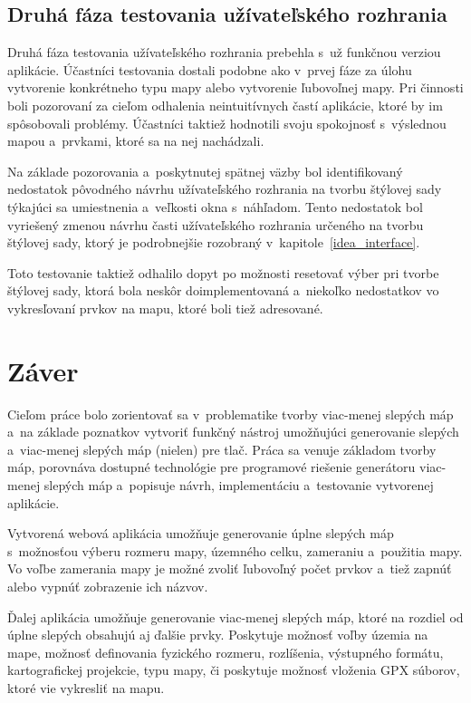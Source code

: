\section{Druhá fáza testovania užívateľského rozhrania}
Druhá fáza testovania užívateľského rozhrania prebehla s~už funkčnou verziou aplikácie. Účastníci testovania dostali podobne ako v~prvej fáze za úlohu vytvorenie konkrétneho typu mapy alebo vytvorenie ľubovoľnej mapy. Pri činnosti boli pozorovaní za cieľom odhalenia neintuitívnych častí aplikácie, ktoré by im spôsobovali problémy. Účastníci taktiež hodnotili svoju spokojnosť s~výslednou mapou a~prvkami, ktoré sa na nej nachádzali.

Na základe pozorovania a~poskytnutej spätnej väzby bol identifikovaný nedostatok pôvodného návrhu užívateľského rozhrania na tvorbu štýlovej sady týkajúci sa umiestnenia a~veľkosti okna s~náhľadom. Tento nedostatok bol vyriešený zmenou návrhu časti užívateľského rozhrania určeného na tvorbu štýlovej sady, ktorý je podrobnejšie rozobraný v~kapitole~\ref{idea_interface}.

Toto testovanie taktiež odhalilo dopyt po možnosti resetovať výber pri tvorbe štýlovej sady, ktorá bola neskôr doimplementovaná a~niekoľko nedostatkov vo vykresľovaní prvkov na mapu, ktoré boli tiež adresované. 


\chapter{Záver}
\label{end}
Cieľom práce bolo zorientovať sa v~problematike tvorby viac-menej slepých máp a~na základe poznatkov vytvoriť funkčný nástroj umožňujúci generovanie slepých a~viac-menej slepých máp (nielen) pre tlač.
Práca sa venuje základom tvorby máp, porovnáva dostupné technológie pre programové riešenie generátoru viac-menej slepých máp a~popisuje návrh, implementáciu a~testovanie vytvorenej aplikácie. 

Vytvorená webová aplikácia umožňuje generovanie úplne slepých máp s~možnosťou výberu rozmeru mapy, územného celku, zameraniu a~použitia mapy. Vo voľbe zamerania mapy je možné zvoliť ľubovoľný počet prvkov a~tiež zapnúť alebo vypnúť zobrazenie ich názvov.

Ďalej aplikácia umožňuje generovanie viac-menej slepých máp, ktoré na rozdiel od úplne slepých obsahujú aj ďalšie prvky. Poskytuje možnosť voľby územia na mape, možnosť definovania fyzického rozmeru, rozlíšenia, výstupného formátu, kartografickej projekcie, typu mapy, či poskytuje možnosť vloženia GPX súborov, ktoré vie vykresliť na mapu. 


